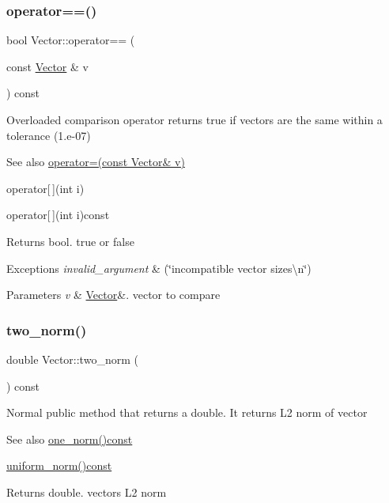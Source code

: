 \subsubsection{\texorpdfstring{operator==()}{operator==()}}
{\footnotesize\ttfamily bool Vector\+::operator== (\begin{DoxyParamCaption}\item[{const \hyperlink{class_vector}{Vector} \&}]{v }\end{DoxyParamCaption}) const}

Overloaded comparison operator returns true if vectors are the same within a tolerance (1.\+e-\/07) \begin{DoxySeeAlso}{See also}
\hyperlink{class_vector_ae48c467a9f65d60e2f7455aba4ca1239}{operator=(const Vector\& v)} 

operator\mbox{[}$\,$\mbox{]}(int i) 

operator\mbox{[}$\,$\mbox{]}(int i)const 
\end{DoxySeeAlso}
\begin{DoxyReturn}{Returns}
bool. true or false 
\end{DoxyReturn}

\begin{DoxyExceptions}{Exceptions}
{\em invalid\+\_\+argument} & (\char`\"{}incompatible vector sizes\textbackslash{}n\char`\"{}) \\
\hline
\end{DoxyExceptions}

\begin{DoxyParams}{Parameters}
{\em v} & \hyperlink{class_vector}{Vector}\&. vector to compare \\
\hline
\end{DoxyParams}
\mbox{\label{class_vector_a4f501290a50d057bb6c57ea64d7e70a4}} 
\subsubsection{\texorpdfstring{two\+\_\+norm()}{two\_norm()}}
{\footnotesize\ttfamily double Vector\+::two\+\_\+norm (\begin{DoxyParamCaption}{ }\end{DoxyParamCaption}) const}

Normal public method that returns a double. It returns L2 norm of vector \begin{DoxySeeAlso}{See also}
\hyperlink{class_vector_a6752a90058ddef427ca6aed12946a737}{one\+\_\+norm()const} 

\hyperlink{class_vector_a50b72131eaf3698a9876d99ab6912a32}{uniform\+\_\+norm()const} 
\end{DoxySeeAlso}
\begin{DoxyReturn}{Returns}
double. vectors L2 norm 
\end{DoxyReturn}
\mbox{\label{class_vector_a50b72131eaf3698a9876d99ab6912a32}} 
